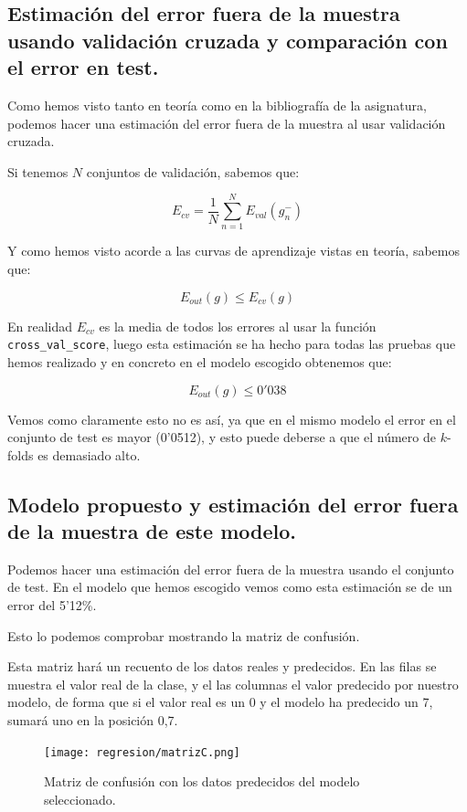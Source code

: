 \documentclass[12pt, spanish]{article}
\begin{document}
\newpage

\subsection{Estimación del error fuera de la muestra usando validación cruzada y comparación con el error en test.}

Como hemos visto tanto en teoría\cite{teoria} como en la bibliografía de la asignatura\cite{libro}, podemos hacer una estimación del error fuera de la muestra al usar validación cruzada.

Si tenemos $N$ conjuntos de validación, sabemos que:

$$E_{cv} = \frac{1}{N}\sum_{n=1}^{N}{E_{val}(g_n^-)}$$

Y como hemos visto acorde a las curvas de aprendizaje vistas en teoría, sabemos que:

$$E_{out}(g) \leq E_{cv}(g) $$

En realidad $E_{cv}$ es la media de todos los errores al usar la función \texttt{cross\_val\_score}, luego esta estimación se ha hecho para todas las pruebas que hemos realizado y en concreto en el modelo escogido obtenemos que:

$$  E_{out}(g) \leq 0'038$$

Vemos como claramente esto no es así, ya que en el mismo modelo el error en el conjunto de test es mayor (0'0512), y esto puede deberse a que el número de $k$-folds es demasiado alto.




\subsection{Modelo propuesto y estimación del error fuera de la muestra de este modelo.}

Podemos hacer una estimación del error fuera de la muestra usando el conjunto de test. En el modelo que hemos escogido vemos como esta estimación se de un error del 5'12\%.

Esto lo podemos comprobar mostrando la matriz de confusión.

Esta matriz hará un recuento de los datos reales y predecidos. En las filas se muestra el valor real de la clase, y el las columnas el valor predecido por nuestro modelo, de forma que si el valor real es un 0 y el modelo ha predecido un 7, sumará uno en la posición 0,7. 

\begin{figure}[H]
	\centering
	\texttt{[image: regresion/matrizC.png]}
	\caption{Matriz de confusión con los datos predecidos del modelo seleccionado.}
	\label{MC}
\end{figure}
\end{document}
